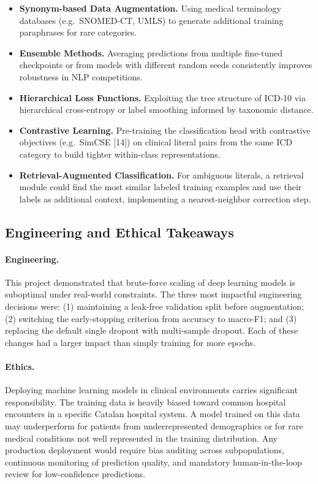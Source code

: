 \documentclass[10pt,a4paper,twocolumn]{article}
\begin{document}
\begin{itemize}
  \item \textbf{Synonym-based Data Augmentation.} Using medical terminology
        databases (e.g.\ SNOMED-CT, UMLS) to generate additional training
        paraphrases for rare categories.

  \item \textbf{Ensemble Methods.} Averaging predictions from multiple
        fine-tuned checkpoints or from models with different random seeds
        consistently improves robustness in NLP competitions.

  \item \textbf{Hierarchical Loss Functions.} Exploiting the tree structure of
        ICD-10 via hierarchical cross-entropy or label smoothing informed by
        taxonomic distance.

  \item \textbf{Contrastive Learning.} Pre-training the classification head
        with contrastive objectives (e.g.\ SimCSE [14]) on clinical literal pairs
        from the same ICD category to build tighter within-class representations.

  \item \textbf{Retrieval-Augmented Classification.} For ambiguous literals, a
        retrieval module could find the most similar labeled training examples
        and use their labels as additional context, implementing a nearest-neighbor
        correction step.
\end{itemize}

\subsection{Engineering and Ethical Takeaways}

\paragraph{Engineering.}
This project demonstrated that brute-force scaling of deep learning models is
suboptimal under real-world constraints. The three most impactful engineering
decisions were: (1) maintaining a leak-free validation split before augmentation;
(2) switching the early-stopping criterion from accuracy to macro-F1; and (3)
replacing the default single dropout with multi-sample dropout. Each of these
changes had a larger impact than simply training for more epochs.

\paragraph{Ethics.}
Deploying machine learning models in clinical environments carries significant
responsibility. The training data is heavily biased toward common hospital
encounters in a specific Catalan hospital system. A model trained on this data
may underperform for patients from underrepresented demographics or for rare
medical conditions not well represented in the training distribution. Any
production deployment would require bias auditing across subpopulations,
continuous monitoring of prediction quality, and mandatory human-in-the-loop
review for low-confidence predictions.
\end{document}
